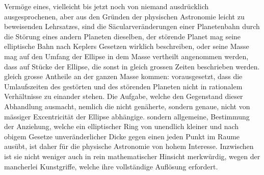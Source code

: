 Vermöge eines, vielleicht bis jetzt noch von niemand ausdrücklich ausgesprochenen, aber aus den Gründen der physischen Astronomie leicht zu beweisenden Lehrsatzes, sind die Säcularveränderungen einer Planetenbahn durch die
Störung eines andern Planeten dieselben, der störende Planet mag seine elliptische Bahn nach Keplers Gesetzen wirklich beschreiben, oder seine Masse mag
auf den Umfang der Ellipse in dem Masse vertheilt angenommen werden, dass
auf Stücke der Ellipse, die sonst in gleich grossen Zeiten beschrieben werden.
gleich grosse Antheile an der ganzen Masse kommen: vorausgesetzt, dass die Umlaufszeiten des gestörten und des störenden Planeten nicht in rationalem Verhältnisse zu einander stehen. Die Aufgabe, welche den Gegenstand dieser Abhandlung ausmacht, nemlich die nicht genäherte, sondern genaue, nicht von mässiger Excentricität der Ellipse abhängige. sondern allgemeine, Bestimmung der Anziehung, welche ein elliptischer Ring von unendlich kleiner und nach obigem
Gesetze unveränderlicher Dicke gegen einen jeden Punkt im Raume ausübt, ist
daher für die physische Astronomie von hohem Interesse. Inzwischen ist sie nicht
weniger auch in rein mathematischer Hinsicht merkwürdig, wegen der mancherlei Kunstgriffe, welche ihre vollständige Auflösung erfordert.

